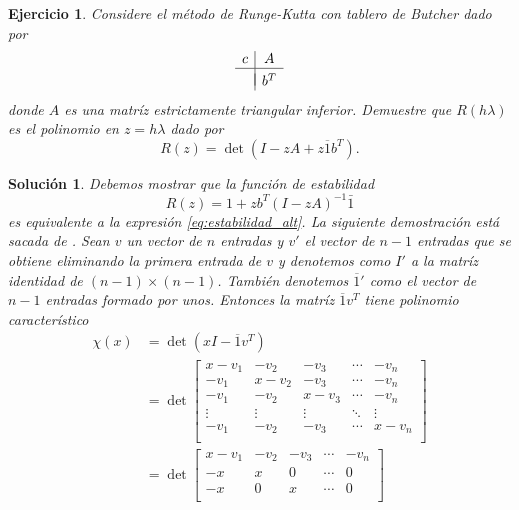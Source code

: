 \documentclass[11pt]{article}
\newtheorem{exercise}{Ejercicio}
\newtheorem*{sol}{Solución}
\newcommand\ol\overline
\begin{document}
\begin{exercise}
  Considere el método de Runge-Kutta con tablero de Butcher dado por
  \begin{equation}
    \begin{array}{c|c}
      c & A \\
      \hline \\[-3mm]
        & b^T
    \end{array}
  \end{equation}
  donde $A$ es una matríz estrictamente triangular inferior. Demuestre
  que $R(h\lambda)$ es el polinomio en $z=h\lambda$ dado por 
  \begin{equation}\label{eq:estabilidad_alt}
    R(z) = \det(I-zA+z\ol 1 b^T)
  .\end{equation}
\end{exercise}
\begin{sol}
  Debemos mostrar que la función de estabilidad
  \begin{equation}
    R(z) = 1 + zb^T(I-zA)^{-1}\bar 1
  \end{equation}
  es equivalente a la expresión \eqref{eq:estabilidad_alt}.
  La siguiente demostración está sacada de
  \cite[p.213]{butcher2004numerical}.
  Sean $v$ un vector de $n$ entradas y $v'$ el vector de $n-1$
  entradas que se obtiene eliminando la primera entrada de $v$ y
  denotemos como $I'$ a la matríz identidad de $(n-1)\times(n-1)$.
  También denotemos $\ol 1'$ como el vector de $n-1$ entradas formado
  por unos. Entonces la matríz $\ol 1v^{T}$ tiene polinomio
  característico
  \begin{align}
    \chi(x)
    &= 
    \det(xI - \ol 1 v^T) \\
    &= \det
    \begin{bmatrix}
      x-v_1 & -v_2 & -v_3 & \cdots & -v_n \\
      -v_1 & x-v_2 & -v_3 & \cdots & -v_n \\
      -v_1 & -v_2 & x-v_3 & \cdots & -v_n \\
      \vdots & \vdots & \vdots & \ddots & \vdots \\
      -v_1 & -v_2 & -v_3 & \cdots & x-v_n \\
    \end{bmatrix}
    \\
    &= \det
    \begin{bmatrix}
      x-v_1 & -v_2 & -v_3 & \cdots & -v_n \\
      -x & x & 0 & \cdots & 0 \\
      -x & 0 & x & \cdots & 0 \\

\end{bmatrix}
\end{align}
\end{sol}
\end{document}
